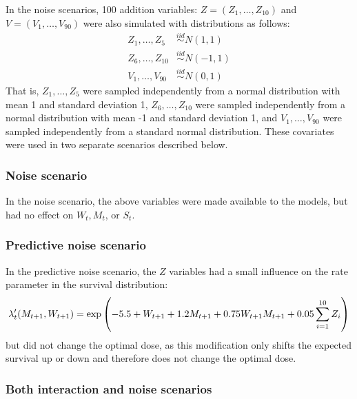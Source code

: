 \documentclass[12pt]{article}
\begin{document}
In the noise scenarios, 100 addition variables: $Z = (Z_{1}, \ldots, Z_{10})$ and $V = (V_{1}, \ldots, V_{90})$ were also simulated with distributions as follows:
\begin{align}
  Z_{1}, \ldots, Z_{5} &\overset{iid}{\sim} N(1, 1) \\
  Z_{6}, \ldots, Z_{10} &\overset{iid}{\sim} N(-1, 1) \\
  V_{1}, \ldots, V_{90} &\overset{iid}{\sim} N(0, 1)
\end{align}
That is, $Z_{1}, \ldots, Z_{5}$ were sampled independently from a normal distribution with mean 1 and standard deviation 1, $Z_{6}, \ldots, Z_{10}$ were sampled independently from a normal distribution with mean -1 and standard deviation 1, and $V_{1}, \ldots, V_{90}$ were sampled independently from a standard normal distribution. These covariates were used in two separate scenarios described below.

\subsubsection{Noise scenario} %
\label{ssub:pure_noise}

In the noise scenario, the above variables were made available to the models, but had no effect on $W_{t}, M_{t}$, or $S_{t}$.


\subsubsection{Predictive noise scenario} %
\label{ssub:predictive_noise}
In the predictive noise scenario, the $Z$ variables had a small influence on the rate parameter in the survival distribution:
\begin{equation}
  \lambda'_{t}(M_{t+1}, W_{t+1}) = \exp\del{-5.5 + W_{t+1} + 1.2 M_{t+1} + 0.75 W_{t+1} M_{t+1} + 0.05 \sum_{i = 1}^{10} Z_{i}}
\end{equation}
but did not change the optimal dose, as this modification only shifts the expected survival up or down and therefore does not change the optimal dose.



\subsubsection{Both interaction and noise scenarios} %
\label{ssub:subsubsection_name}
\end{document}
